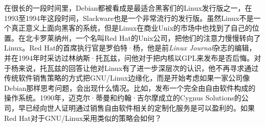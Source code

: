 \fi

\ifdefined\chs
在很长的一段时间里，Debian都被看成是最适合黑客们的Linux发行版之一，在1993至1994年这段时间，Slackware也是一个非常流行的发行版。虽然Linux不是一个真正意义上面向黑客的系统，但是Linux在商业Unix的市场中也找到了自己的位置。在北卡罗莱纳州，一个名叫Red Hat的Unix公司，把他们的注意力慢慢转向了Linux。Red Hat的首席执行官是罗伯特·杨，他是前\textit{Linux Journal}杂志的编辑，并在1994年时采访过林纳斯·托瓦兹，问他对于把内核以GPL来发布是否后悔。对于杨来说，托瓦兹的回答让他对Linux有了进一步深层次的认识，他不再寻求通过传统软件销售策略的方式把GNU/Linux边缘化，而是开始考虑如果一家公司像Debian那样思考问题，会出现什么情况。比如，发布一个完全由自由软件构成的操作系统。1990年，迈克尔·蒂曼和约翰·吉尔摩成立的Cygnus Solutions的公司，早已经向世人证明通过销售自由软件相关的定制化服务是可以盈利的。如果Red Hat对于GNU/Linux采用类似的策略会如何？
\fi


